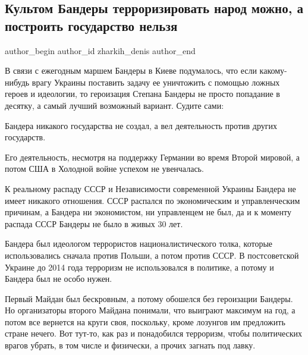  
 
 
 
 
 
\subsection{Культом Бандеры терроризировать народ можно, а построить государство нельзя}
\label{sec:03_01_2021.fb.zharkih_denis.1.bandera}
 
\ifcmt
 author_begin
   author_id zharkih_denis
 author_end
\fi

В связи с ежегодным маршем Бандеры в Киеве подумалось, что если какому-нибудь
врагу Украины поставить задачу ее уничтожить с помощью ложных героев и
идеологии, то героизация Степана Бандеры не просто попадание в десятку, а самый
лучший возможный вариант. Судите сами:

Бандера никакого государства не создал, а вел деятельность против других
государств.


Его деятельность, несмотря на поддержку Германии во время Второй мировой, а
потом США в Холодной войне успехом не увенчалась. 

К реальному распаду СССР и Независимости современной Украины Бандера не имеет
никакого отношения. СССР распался по экономическим и управленческим причинам, а
Бандера ни экономистом, ни управленцем не был, да и к моменту распада СССР
Бандеры не было в живых 30 лет. 

Бандера был идеологом террористов националистического толка, которые
использовались сначала против Польши, а потом против СССР. В постсоветской
Украине до 2014 года терроризм не использовался в политике, а потому и Бандера
был не особо нужен. 

Первый Майдан был бескровным, а потому обошелся без героизации Бандеры. Но
организаторы второго Майдана понимали, что выиграют максимум на год, а потом
все вернется на круги своя, поскольку, кроме лозунгов им предложить стране
нечего. Вот тут-то, как раз и понадобился терроризм, чтобы политических врагов
убрать, в том числе и физически, а прочих загнать под лавку. 

